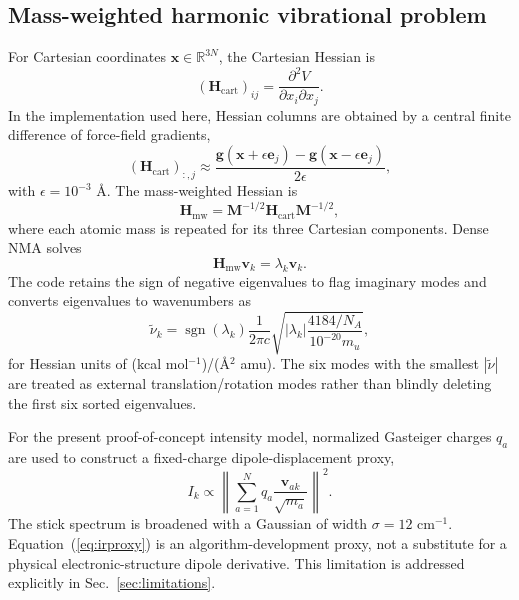 \documentclass[aip,jcp,reprint,amsmath,amssymb,floatfix]{revtex4-2}
\newcommand{\Hmw}{\mathbf{H}_{\mathrm{mw}}}
\newcommand{\Hcart}{\mathbf{H}_{\mathrm{cart}}}
\begin{document}
\subsection{Mass-weighted harmonic vibrational problem}
\cite{Wilson1955MolecularVibrations}
For Cartesian coordinates $\mathbf{x}\in\mathbb{R}^{3N}$, the Cartesian Hessian is
\begin{equation}
(\Hcart)_{i j}=\frac{\partial^2 V}{\partial x_i\partial x_j}.
\label{eq:hcart}
\end{equation}
In the implementation used here, Hessian columns are obtained by a central finite difference of force-field gradients,
\begin{equation}
(\Hcart)_{:,j}\approx
\frac{\mathbf{g}(\mathbf{x}+\epsilon\mathbf{e}_j)-
      \mathbf{g}(\mathbf{x}-\epsilon\mathbf{e}_j)}{2\epsilon},
\label{eq:fdhessian}
\end{equation}
with $\epsilon=10^{-3}$ \AA.  The mass-weighted Hessian is
\begin{equation}
\Hmw=\mathbf{M}^{-1/2}\Hcart\mathbf{M}^{-1/2},
\label{eq:massweight}
\end{equation}
where each atomic mass is repeated for its three Cartesian components. Dense NMA solves
\begin{equation}
\Hmw\mathbf{v}_k=\lambda_k\mathbf{v}_k.
\label{eq:eigenproblem}
\end{equation}
The code retains the sign of negative eigenvalues to flag imaginary modes and converts eigenvalues to wavenumbers as
\begin{equation}
\widetilde{\nu}_k = \operatorname{sgn}(\lambda_k)
\frac{1}{2\pi c}
\sqrt{\left|\lambda_k\right|\frac{4184/N_A}{10^{-20}m_u}},
\label{eq:freqconversion}
\end{equation}
for Hessian units of (kcal mol$^{-1}$)/(\AA$^2$ amu). The six modes with the smallest $|\widetilde{\nu}|$ are treated as external translation/rotation modes rather than blindly deleting the first six sorted eigenvalues.

For the present proof-of-concept intensity model, normalized Gasteiger charges $q_a$ are used to construct a fixed-charge dipole-displacement proxy,\cite{Gasteiger1980Charges}
\begin{equation}
I_k \propto
\left\lVert
\sum_{a=1}^{N}q_a
\frac{\mathbf{v}_{ak}}{\sqrt{m_a}}
\right\rVert^2.
\label{eq:irproxy}
\end{equation}
The stick spectrum is broadened with a Gaussian of width $\sigma=12$ cm$^{-1}$. Equation~(\ref{eq:irproxy}) is an algorithm-development proxy, not a substitute for a physical electronic-structure dipole derivative. This limitation is addressed explicitly in Sec.~\ref{sec:limitations}.
\end{document}
